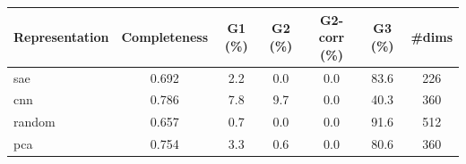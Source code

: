 \begin{tabular}{lcccccc}
\toprule
Representation & Completeness & G1 (\%) & G2 (\%) & G2-corr (\%) & G3 (\%) & \#dims \\
\midrule
sae & 0.692 & 2.2 & 0.0 & 0.0 & 83.6 & 226 \\
cnn & 0.786 & 7.8 & 9.7 & 0.0 & 40.3 & 360 \\
random & 0.657 & 0.7 & 0.0 & 0.0 & 91.6 & 512 \\
pca & 0.754 & 3.3 & 0.6 & 0.0 & 80.6 & 360 \\
\bottomrule
\end{tabular}